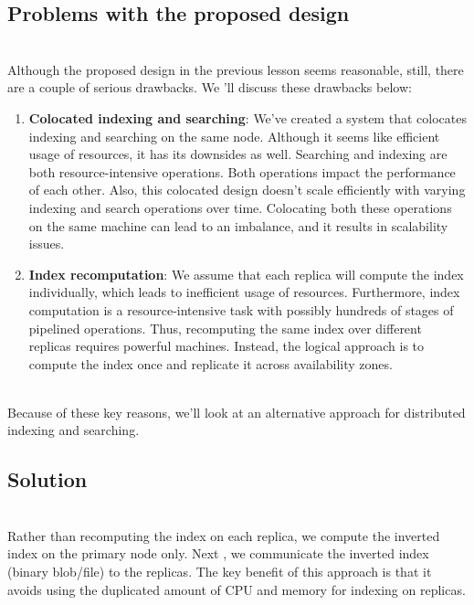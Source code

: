 

\subsection{Problems with the proposed design}\label{c3lYjjMjQfr7RRLXjD5t9}
\\
Although the proposed design in the previous lesson seems reasonable, still, there are a couple of serious drawbacks. We 'll discuss these drawbacks below:

\begin{enumerate}
\item
\protect{}\label{dv5ZKe2te1qu4uvmM93qR}
\textbf{Colocated indexing and searching}: We've created a system that colocates indexing and searching on the same node. Although it seems like efficient usage of resources, it has its downsides as well. Searching and indexing are both resource-intensive operations. Both operations impact the performance of each other. Also, this colocated design doesn't scale efficiently with varying indexing and search operations over time. Colocating both these operations on the same machine can lead to an imbalance, and it results in scalability issues.
\item
\protect{}\label{Y1AAAGTczUoPYlRe7xrPj}
\textbf{Index recomputation}: We assume that each replica will compute the index individually, which leads to inefficient usage of resources. Furthermore, index computation is a resource-intensive task with possibly hundreds of stages of pipelined operations. Thus, recomputing the same index over different replicas requires powerful machines. Instead, the logical approach is to compute the index once and replicate it across availability zones.
\end{enumerate}
\\
Because of these key reasons, we'll look at an alternative approach for distributed indexing and searching.

\subsection{Solution}\label{8fDEQmto12e-eKZI2Ixur}
\\
Rather than recomputing the index on each replica, we compute the inverted index on the primary node only. Next , we communicate the inverted index (binary blob/file) to the replicas. The key benefit of this approach is that it avoids using the duplicated amount of CPU and memory for indexing on replicas.

